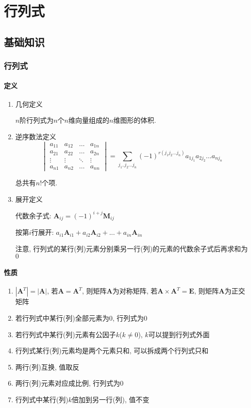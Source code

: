 \chapter{行列式}
\section{基础知识}
\subsection{行列式}
\subsubsection{定义}
\begin{enumerate}
\item 几何定义\par $ n $阶行列式为$ n $个$ n $维向量组成的$ n $维图形的体积.
\item 逆序数法定义
\begin{equation*}
\begin{vmatrix}
a_{11}	&a_{12}  &\dots  &a_{1n}  \\
a_{21}	&a_{22}  &\dots  &a_{2n}  \\
\vdots	&\vdots  &\ddots  &\vdots  \\
a_{n1}	&a_{n2}  &\dots  &a_{nn}  
\end{vmatrix}  = \sum_{j_{1},j_{2}...j_{n}}(-1)^{r(j_{1}j_{2}...j_{n})}a_{1j_{1}}a_{2j_{2}}...a_{nj_{n}}
\end{equation*}\par
总共有$ n! $个项.
\item 展开定义\par 代数余子式: $ \bm{A}_{ij}=(-1)^{i+j}\bm{M}_{ij} $\par 按第$ i $行展开: $ a_{i1}\bm{A}_{i1}+a_{i2}\bm{A}_{i2}+...+a_{in}\bm{A}_{in} $\par 注意, 行列式的某行(列)元素分别乘另一行(列)的元素的代数余子式后再求和为$ 0 $
\end{enumerate}
\subsubsection{性质}
\begin{enumerate}
\item $ |\bm{A}^{T}|=|\bm{A}| $, 若$ \bm{A} = \bm{A}^{T} $, 则矩阵$ \bm{A} $为对称矩阵, 若$ \bm{A} \times \bm{A}^{T} = \bm{E} $, 则矩阵$ \bm{A} $为正交矩阵
\item 若行列式中某行(列)全部元素为$ 0 $, 行列式为$ 0 $
\item 若行列式中某行(列)元素有公因子$ k $($ k\neq 0 $), $ k $可以提到行列式外面
\item 行列式某行(列)元素均是两个元素只和, 可以拆成两个行列式只和
\item 两行(列)互换, 值取反
\item 两行(列)元素对应成比例, 行列式为$ 0 $
\item 行列式中某行(列)$ k $倍加到另一行(列), 值不变
\end{enumerate}
